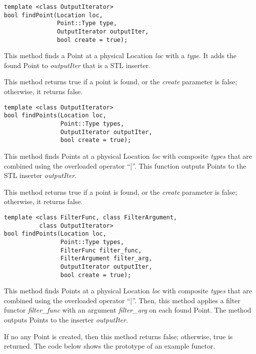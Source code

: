 \begin{verbatim}
template <class OutputIterator>
bool findPoint(Location loc,
               Point::Type type,
               OutputIterator outputIter,
               bool create = true);

\end{verbatim}



This method finds a Point at a physical Location \emph{loc} with a \emph{type}.  It adds
the found Point to \emph{outputIter} that is a STL inserter.

This method returns true if a point is found, or the \emph{create} parameter is
false; otherwise, it returns false.


\begin{verbatim}
template <class OutputIterator>
bool findPoints(Location loc,
                Point::Type types,
                OutputIterator outputIter,
                bool create = true);

\end{verbatim}



This method finds Points at a physical Location \emph{loc} with composite \emph{types}
that are combined using the overloaded operator ``|''. This function outputs
Points to the STL inserter \emph{outputIter}.

This method returns true if a point is found, or the \emph{create} parameter is
false; otherwise, it returns false.


\begin{verbatim}
template <class FilterFunc, class FilterArgument,
          class OutputIterator>
bool findPoints(Location loc,
                Point::Type types,
                FilterFunc filter_func,
                FilterArgument filter_arg,
                OutputIterator outputIter,
                bool create = true);

\end{verbatim}



This method finds Points at a physical Location \emph{loc} with composite \emph{types}
that are combined using the overloaded operator ``|''. Then, this method applies a
filter functor \emph{filter\_func} with an argument \emph{filter\_arg} on each found Point.
The method outputs Points to the inserter \emph{outputIter}.

If no any Point is created, then this method returns false; otherwise, true is
returned. The code below shows the prototype of an example functor.


